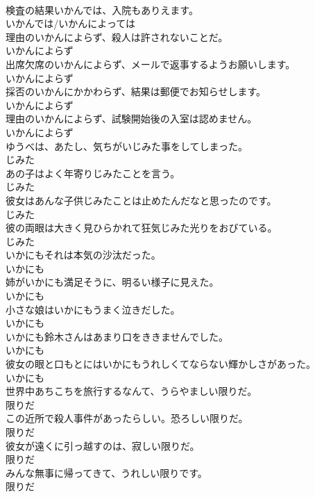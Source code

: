 \documentclass[8pt]{extreport}
\begin{document}
\begin{CJK}{UTF8}{min}
\\	検査の結果いかんでは、入院もありえます。	
\\	いかんでは/いかんによっては
\\	理由のいかんによらず、殺人は許されないことだ。	
\\	いかんによらず
\\	出席欠席のいかんによらず、メールで返事するようお願いします。	
\\	いかんによらず
\\	採否のいかんにかかわらず、結果は郵便でお知らせします。	
\\	いかんによらず
\\	理由のいかんによらず、試験開始後の入室は認めません。	
\\	いかんによらず
\\	ゆうべは、あたし、気ちがいじみた事をしてしまった。	
\\	じみた
\\	あの子はよく年寄りじみたことを言う。	
\\	じみた
\\	彼女はあんな子供じみたことは止めたんだなと思ったのです。	
\\	じみた
\\	彼の両眼は大きく見ひらかれて狂気じみた光りをおびている。	
\\	じみた
\\	いかにもそれは本気の沙汰だった。	
\\	いかにも
\\	姉がいかにも満足そうに、明るい様子に見えた。	
\\	いかにも
\\	小さな娘はいかにもうまく泣きだした。	
\\	いかにも
\\	いかにも鈴木さんはあまり口をききませんでした。	
\\	いかにも
\\	彼女の眼と口もとにはいかにもうれしくてならない輝かしさがあった。	
\\	いかにも
\\	世界中あちこちを旅行するなんて、うらやましい限りだ。	
\\	限りだ
\\	この近所で殺人事件があったらしい。恐ろしい限りだ。	
\\	限りだ
\\	彼女が遠くに引っ越すのは、寂しい限りだ。	
\\	限りだ
\\	みんな無事に帰ってきて、うれしい限りです。	
\\	限りだ

\end{CJK}
\end{document}
